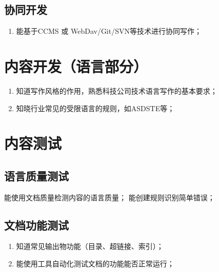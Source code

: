 \documentclass[letterpaper,10pt,english]{sphinxmanual}
\begin{document}
\subsection{协同开发}
\label{\detokenize{about/tw-comp-model:id13}}\begin{enumerate}
%
\item {} 
\sphinxAtStartPar
能基于CCMS 或 WebDav/Git/SVN等技术进行协同写作；

\end{enumerate}


\section{内容开发（语言部分）}
\label{\detokenize{about/tw-comp-model:id14}}\begin{enumerate}
%
\item {} 
\sphinxAtStartPar
知道写作风格的作用，熟悉科技公司技术语言写作的基本要求；

\item {} 
\sphinxAtStartPar
知晓行业常见的受限语言的规则，如ASD\sphinxhyphen{}STE等；

\end{enumerate}


\section{内容测试}
\label{\detokenize{about/tw-comp-model:id15}}

\subsection{语言质量测试}
\label{\detokenize{about/tw-comp-model:id16}}
\sphinxAtStartPar
能使用文档质量检测内容的语言质量；
能创建规则识别简单错误；


\subsection{文档功能测试}
\label{\detokenize{about/tw-comp-model:id17}}\begin{enumerate}
%
\item {} 
\sphinxAtStartPar
知道常见输出物功能（目录、超链接、索引）；

\item {} 
\sphinxAtStartPar
能使用工具自动化测试文档的功能能否正常运行；

\end{enumerate}
\end{document}
